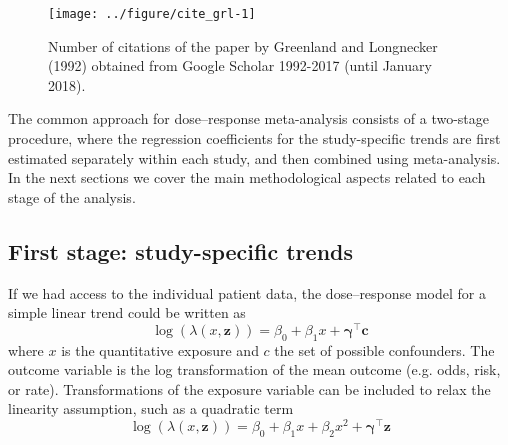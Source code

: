 \documentclass[11pt,a4paper,twoside,openany]{book}\usepackage{knitr}
\begin{document}
{{\begin{knitrout}\footnotesize
{}\color{fgcolor}\begin{figure}[ht!]

{\centering \texttt{[image: ../figure/cite\_grl-1]} 

}

\caption[Number of citations of the paper by Greenland and Longnecker (1992) obtained from Google Scholar 1992-2017 (until January 2018)]{Number of citations of the paper by Greenland and Longnecker (1992) obtained from Google Scholar 1992-2017 (until January 2018).}\label{fig:cite_grl}
\end{figure}


\end{knitrout}

The common approach for dose--response meta-analysis consists of a two-stage procedure, where the regression coefficients for the study-specific trends are first estimated separately within each study, and then combined using meta-analysis. In the next sections we cover the main methodological aspects related to each stage of the analysis.


\subsection{First stage: study-specific trends}\label{sec:1st_stage}

If we had access to the individual patient data, the dose--response model for a simple linear trend could be written as
\begin{equation}
\log \left( \lambda \left(x, \mathbf{z} \right) \right) =  \beta_0 + \beta_1x + \boldsymbol{\gamma}^\top \mathbf{c}
\label{eq:lin_ipd}
\end{equation}
\noindent where $x$ is the quantitative exposure and $c$ the set of possible confounders. The outcome variable is the log transformation of the mean outcome (e.g. odds, risk, or rate). Transformations of the exposure variable can be included to relax the linearity assumption, such as a quadratic term
\begin{equation}
\log \left( \lambda \left(x, \mathbf{z} \right) \right) =  \beta_0 + \beta_1x + \beta_2x^2 + \boldsymbol{\gamma}^\top \mathbf{z}
\label{eq:quadr_ipd}
\end{equation}

}}
\end{document}
